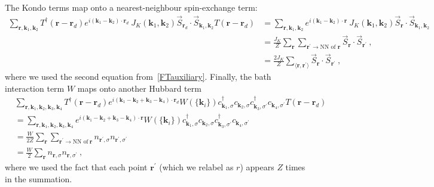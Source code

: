 The Kondo terms map onto a nearest-neighbour spin-exchange term:
\begin{equation}\begin{aligned}
	\sum_{\bm r,\bm k_1, \bm k_2}T^\dagger({\bm r} - {\bm r}_d) e^{i (\bm k_1 - \bm k_2) \cdot \bm r_d }~J_K({\bm k_1, \bm k_2}) \vec{S}_{\bm r_d} \cdot \vec{S}_{\bm k_1, \bm k_2} T({\bm r} - {\bm r}_d) &= \sum_{\bm r,\bm k_1, \bm k_2} e^{i (\bm k_1 - \bm k_2) \cdot \bm r }~J_K({\bm k_1, \bm k_2}) \vec{S}_{\bm r} \cdot \vec{S}_{\bm k_1, \bm k_2} \\
																																																		 &=\frac{J_K}{Z}\sum_{\bm r}\sum_{\bm r^\prime \to \text{NN of~}\bm r} \vec{S}_{\bm r} \cdot \vec{S}_{\bm r^\prime}~,\\
																																																		 &=\frac{2J_K}{Z}\sum_{\langle \bm r,\bm r^\prime \rangle } \vec{S}_{\bm r} \cdot \vec{S}_{\bm r^\prime}~,
\end{aligned}\end{equation}
where we used the second equation from~\ref{FTauxiliary}. Finally, the bath interaction term \(W\) maps onto another Hubbard term
\begin{equation}\begin{aligned}
	&\sum_{\bm r,\bm k_1, \bm k_2, \bm k_3, \bm k_4}T^\dagger({\bm r} - {\bm r}_d) e^{i (\bm k_1 - \bm k_2 + \bm k_3 - \bm k_4) \cdot \bm r_d } W(\{\bm k_i\}) c^\dagger_{\bm k_1, \sigma}c_{\bm k_2, \sigma}c^\dagger_{\bm k_3, \sigma^\prime}c_{\bm k_4, \sigma^\prime} T({\bm r} - {\bm r}_d) \\
	&= \sum_{\bm r,\bm k_1, \bm k_2, \bm k_3, \bm k_4}e^{i (\bm k_1 - \bm k_2 + \bm k_3 - \bm k_4) \cdot \bm r } W(\{\bm k_i\}) c^\dagger_{\bm k_1, \sigma}c_{\bm k_2, \sigma}c^\dagger_{\bm k_3, \sigma^\prime}c_{\bm k_4, \sigma^\prime} \\
	&= \frac{W}{2Z}\sum_{\bm r}\sum_{\bm r^\prime \to \text{NN of}~\bm r}n_{\bm r^\prime,\sigma}n_{\bm r^\prime,\sigma^\prime}\\
	&= \frac{W}{2}\sum_{\bm r}n_{\bm r,\sigma}n_{\bm r,\sigma^\prime}~,
\end{aligned}\end{equation}
where we used the fact that each point \(\bm r^\prime\) (which we relabel as \(r\)) appears \(Z\) times in the summation.

